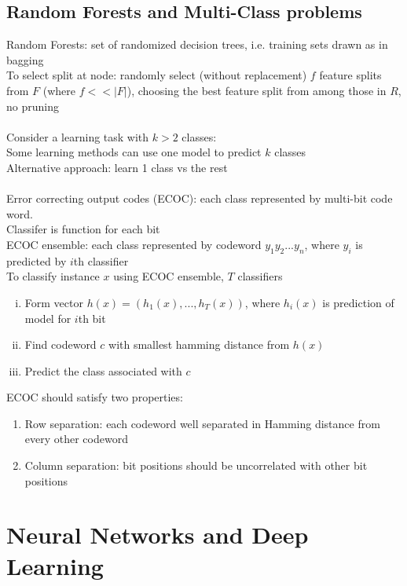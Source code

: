 \documentclass{article}
\begin{document}
 		\subsection{Random Forests and Multi-Class problems}
 			Random Forests: set of randomized decision trees, i.e. training sets drawn as in bagging \\
 			To select split at node: randomly select (without replacement) $f$ feature splits from $F$ (where $f << |F|$), choosing the best feature split from among those in $R$, no pruning \\
 			\\
 			Consider a learning task with $k > 2$ classes: \\
 			Some learning methods can use one model to predict $k$ classes \\
 			Alternative approach: learn 1 class vs the rest \\
 			\\
 			Error correcting output codes (ECOC): each class represented by multi-bit code word. \\
 			Classifer is function for each bit \\
 			ECOC ensemble: each class represented by codeword $y_1y_2...y_n$, where $y_i$ is predicted by  $i$th classifier \\
 			To classify instance $x$ using ECOC ensemble, $T$ classifiers
 			\begin{enumerate}[(i)]
 				\item Form vector $h(x) = (h_1(x), ..., h_T(x))$, where $h_i(x)$ is prediction of model for $i$th bit
 				\item Find codeword $c$ with smallest hamming distance from $h(x)$
 				\item Predict the class associated with $c$
 				\end{enumerate}
 			ECOC should satisfy two properties:
 			\begin{enumerate}
 				\item Row separation: each codeword well separated in Hamming distance from every other codeword
 				\item Column separation: bit positions should be uncorrelated with other bit positions
 				\end{enumerate}
		\clearpage

	\section{Neural Networks and Deep Learning}
\end{document}
